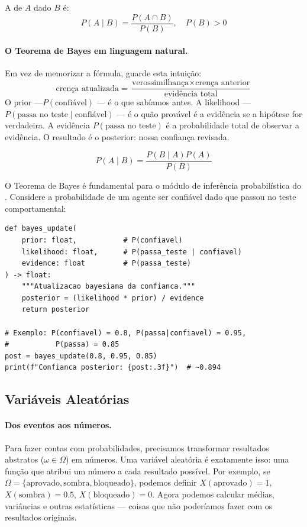 \begin{definicao}
    A  de $A$ dado $B$ é:
    \[
    P(A \mid B) = \frac{P(A \cap B)}{P(B)}, \quad P(B) > 0
    \]
\end{definicao}

\paragraph{O Teorema de Bayes em linguagem natural.} Em vez de memorizar a
fórmula, guarde esta intuição:
\[
\text{crença atualizada} = \frac{\text{verossimilhança} \times
\text{crença anterior}}{\text{evidência total}}
\]
O prior $\text{---}P(\text{confiável})$ --- é o que sabíamos antes. A
likelihood --- $P(\text{passa no teste} \mid \text{confiável})$ --- é o
quão provável é a evidência se a hipótese for verdadeira. A evidência
$P(\text{passa no teste})$ é a probabilidade total de observar a
evidência. O resultado é o posterior: nossa confiança revisada.

\begin{teorema}
    \[
    P(A \mid B) = \frac{P(B \mid A) P(A)}{P(B)}
    \]
\end{teorema}

\begin{exemplo}
    O Teorema de Bayes é fundamental para o módulo de inferência
    probabilística do \opencodeeco{}. Considere a probabilidade de um agente
    ser confiável dado que passou no teste comportamental:
    \begin{lstlisting}[style=pythonstyle]
def bayes_update(
    prior: float,           # P(confiavel)
    likelihood: float,      # P(passa_teste | confiavel)
    evidence: float         # P(passa_teste)
) -> float:
    """Atualizacao bayesiana da confianca."""
    posterior = (likelihood * prior) / evidence
    return posterior

# Exemplo: P(confiavel) = 0.8, P(passa|confiavel) = 0.95,
#           P(passa) = 0.85
post = bayes_update(0.8, 0.95, 0.85)
print(f"Confianca posterior: {post:.3f}")  # ~0.894
    \end{lstlisting}
\end{exemplo}

\subsection{Variáveis Aleatórias}

\paragraph{Dos eventos aos números.} Para fazer contas com probabilidades,
precisamos transformar resultados abstratos ($\omega \in \Omega$) em números.
Uma variável aleatória é exatamente isso: uma função que atribui um número a
cada resultado possível. Por exemplo, se $\Omega = \{\text{aprovado},
\text{sombra}, \text{bloqueado}\}$, podemos definir $X(\text{aprovado}) = 1$,
$X(\text{sombra}) = 0.5$, $X(\text{bloqueado}) = 0$. Agora podemos calcular
médias, variâncias e outras estatísticas --- coisas que não poderíamos fazer
com os resultados originais.

